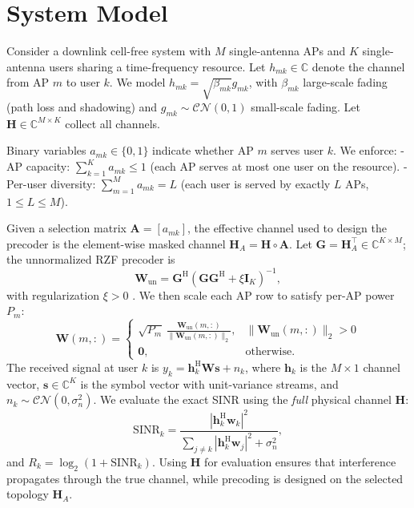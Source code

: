 \section{System Model}
Consider a downlink cell-free system with $M$ single-antenna APs and $K$ single-antenna users sharing a time-frequency resource. Let $h_{mk}\in\mathbb{C}$ denote the channel from AP $m$ to user $k$. We model $h_{mk}=\sqrt{\beta_{mk}} g_{mk}$, with $\beta_{mk}$ large-scale fading (path loss and shadowing) and $g_{mk}\sim \mathcal{CN}(0,1)$ small-scale fading. Let $\mathbf{H}\in \mathbb{C}^{M\times K}$ collect all channels.

Binary variables $a_{mk}\in\{0,1\}$ indicate whether AP $m$ serves user $k$. We enforce:
- AP capacity: $\sum_{k=1}^K a_{mk}\le 1$ (each AP serves at most one user on the resource).
- Per-user diversity: $\sum_{m=1}^M a_{mk}=L$ (each user is served by exactly $L$ APs, $1\le L\le M$).

Given a selection matrix $\mathbf{A}=[a_{mk}]$, the effective channel used to design the precoder is the element-wise masked channel $\mathbf{H}_A=\mathbf{H}\circ \mathbf{A}$. Let $\mathbf{G}=\mathbf{H}_A^\top\in \mathbb{C}^{K\times M}$; the unnormalized RZF precoder is
\begin{equation}
\mathbf{W}_{\mathrm{un}}=\mathbf{G}^\mathrm{H}\left(\mathbf{G}\mathbf{G}^\mathrm{H}+\xi \mathbf{I}_K\right)^{-1},
\end{equation}
with regularization $\xi>0$ \cite{peel2005vector}. We then scale each AP row to satisfy per-AP power $P_m$:
\begin{equation}
\mathbf{W}(m,:)=
\begin{cases}
\sqrt{P_m}\,\frac{\mathbf{W}_{\mathrm{un}}(m,:)}{\|\mathbf{W}_{\mathrm{un}}(m,:)\|_2}, & \|\mathbf{W}_{\mathrm{un}}(m,:)\|_2>0\\
\mathbf{0}, & \text{otherwise}.
\end{cases}
\end{equation}
The received signal at user $k$ is $y_k=\mathbf{h}_k^\mathrm{H}\mathbf{W}\mathbf{s}+n_k$, where $\mathbf{h}_k$ is the $M\times 1$ channel vector, $\mathbf{s}\in\mathbb{C}^{K}$ is the symbol vector with unit-variance streams, and $n_k\sim\mathcal{CN}(0,\sigma_n^2)$. We evaluate the exact SINR using the \emph{full} physical channel $\mathbf{H}$:
\begin{equation}
\mathrm{SINR}_k=\frac{|\mathbf{h}_k^\mathrm{H}\mathbf{w}_k|^2}{\sum_{j\neq k}|\mathbf{h}_k^\mathrm{H}\mathbf{w}_j|^2+\sigma_n^2},

\end{equation}
and $R_k=\log_2(1+\mathrm{SINR}_k)$. Using $\mathbf{H}$ for evaluation ensures that interference propagates through the true channel, while precoding is designed on the selected topology $\mathbf{H}_A$.

